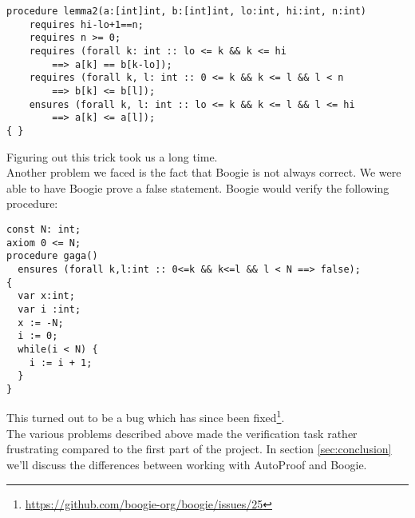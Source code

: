 \begin{verbatim}
procedure lemma2(a:[int]int, b:[int]int, lo:int, hi:int, n:int) 
    requires hi-lo+1==n;
    requires n >= 0;
    requires (forall k: int :: lo <= k && k <= hi 
    	==> a[k] == b[k-lo]);
    requires (forall k, l: int :: 0 <= k && k <= l && l < n 
    	==> b[k] <= b[l]);
    ensures (forall k, l: int :: lo <= k && k <= l && l <= hi 
    	==> a[k] <= a[l]);
{ }
\end{verbatim}

Figuring out this trick took us a long time.\\

Another problem we faced is the fact that Boogie is not always correct. We were able to have Boogie prove 
a false statement. Boogie would verify the following procedure:

\begin{verbatim}
const N: int;
axiom 0 <= N;
procedure gaga()
  ensures (forall k,l:int :: 0<=k && k<=l && l < N ==> false); 
{
  var x:int;
  var i :int;
  x := -N;
  i := 0;
  while(i < N) { 
    i := i + 1;
  }
}
\end{verbatim}

This turned out to be a bug which has since been fixed\footnote{\url{https://github.com/boogie-org/boogie/issues/25}}.\\

The various problems described above made the verification task rather frustrating compared to the
first part of the project. In section \ref{sec:conclusion} we'll discuss the differences between working with 
AutoProof and Boogie.


